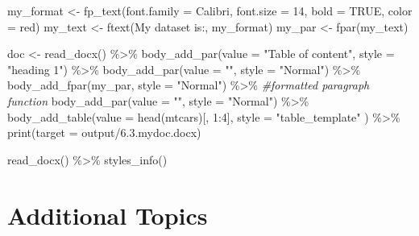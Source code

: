 \documentclass[
]{book}
\newenvironment{Shaded}{\begin{snugshade}}{\end{snugshade}}
\newcommand{\AttributeTok}[1]{\textcolor[rgb]{0.77,0.63,0.00}{#1}}
\newcommand{\CommentTok}[1]{\textcolor[rgb]{0.56,0.35,0.01}{\textit{#1}}}
\newcommand{\ConstantTok}[1]{\textcolor[rgb]{0.00,0.00,0.00}{#1}}
\newcommand{\DecValTok}[1]{\textcolor[rgb]{0.00,0.00,0.81}{#1}}
\newcommand{\FunctionTok}[1]{\textcolor[rgb]{0.00,0.00,0.00}{#1}}
\newcommand{\NormalTok}[1]{#1}
\newcommand{\OtherTok}[1]{\textcolor[rgb]{0.56,0.35,0.01}{#1}}
\newcommand{\SpecialCharTok}[1]{\textcolor[rgb]{0.00,0.00,0.00}{#1}}
\newcommand{\StringTok}[1]{\textcolor[rgb]{0.31,0.60,0.02}{#1}}
\begin{document}
\begin{Shaded}
\begin{Highlighting}[]
\NormalTok{my\_format }\OtherTok{\textless{}{-}} \FunctionTok{fp\_text}\NormalTok{(}\AttributeTok{font.family =} \StringTok{\textquotesingle{}Calibri\textquotesingle{}}\NormalTok{, }\AttributeTok{font.size =} \DecValTok{14}\NormalTok{, }\AttributeTok{bold =} \ConstantTok{TRUE}\NormalTok{, }\AttributeTok{color =} \StringTok{\textquotesingle{}red\textquotesingle{}}\NormalTok{)}
\NormalTok{my\_text }\OtherTok{\textless{}{-}} \FunctionTok{ftext}\NormalTok{(}\StringTok{\textquotesingle{}My dataset is:\textquotesingle{}}\NormalTok{, my\_format)}
\NormalTok{my\_par }\OtherTok{\textless{}{-}} \FunctionTok{fpar}\NormalTok{(my\_text)}

\NormalTok{doc }\OtherTok{\textless{}{-}} \FunctionTok{read\_docx}\NormalTok{() }\SpecialCharTok{\%\textgreater{}\%} 
  \FunctionTok{body\_add\_par}\NormalTok{(}\AttributeTok{value =} \StringTok{"Table of content"}\NormalTok{, }\AttributeTok{style =} \StringTok{"heading 1"}\NormalTok{) }\SpecialCharTok{\%\textgreater{}\%} 
  \FunctionTok{body\_add\_par}\NormalTok{(}\AttributeTok{value =} \StringTok{""}\NormalTok{, }\AttributeTok{style =} \StringTok{"Normal"}\NormalTok{) }\SpecialCharTok{\%\textgreater{}\%} 
  \FunctionTok{body\_add\_fpar}\NormalTok{(my\_par, }\AttributeTok{style =} \StringTok{"Normal"}\NormalTok{) }\SpecialCharTok{\%\textgreater{}\%} \CommentTok{\#formatted paragraph function}
  \FunctionTok{body\_add\_par}\NormalTok{(}\AttributeTok{value =} \StringTok{""}\NormalTok{, }\AttributeTok{style =} \StringTok{"Normal"}\NormalTok{) }\SpecialCharTok{\%\textgreater{}\%} 
  \FunctionTok{body\_add\_table}\NormalTok{(}\AttributeTok{value =} \FunctionTok{head}\NormalTok{(mtcars)[, }\DecValTok{1}\SpecialCharTok{:}\DecValTok{4}\NormalTok{], }\AttributeTok{style =} \StringTok{"table\_template"}\NormalTok{ ) }\SpecialCharTok{\%\textgreater{}\%} 
  \FunctionTok{print}\NormalTok{(}\AttributeTok{target =} \StringTok{\textquotesingle{}output/6.3.mydoc.docx\textquotesingle{}}\NormalTok{)}

\FunctionTok{read\_docx}\NormalTok{() }\SpecialCharTok{\%\textgreater{}\%} \FunctionTok{styles\_info}\NormalTok{() }
\end{Highlighting}
\end{Shaded}

\hypertarget{part-additional-topics}{%
\part*{Additional Topics}\label{part-additional-topics}}
\end{document}
